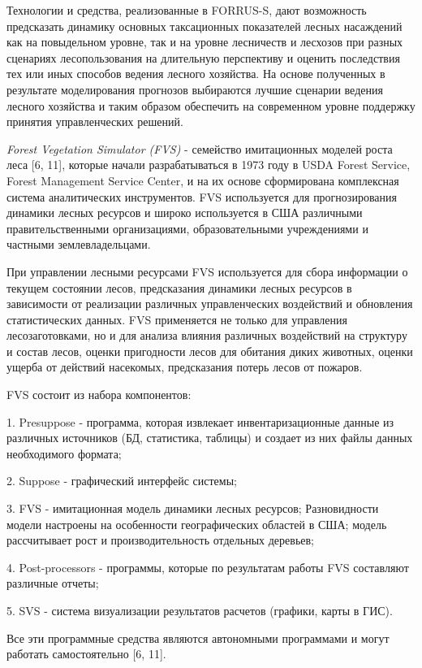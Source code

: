 \documentclass{article}
\begin{document}
Технологии и средства, реализованные в FORRUS-S, 
дают возможность предсказать динамику основных 
таксационных показателей лесных насаждений 
как на повыдельном уровне, так и на уровне лесничеств 
и лесхозов при разных сценариях лесопользования 
на длительную перспективу и оценить последствия 
тех или иных способов ведения лесного хозяйства. 
На основе полученных в результате моделирования 
прогнозов выбираются лучшие сценарии ведения 
лесного хозяйства и таким образом обеспечить 
на современном уровне поддержку принятия управленческих 
решений. 

\textit{Forest Vegetation Simulator (FVS)} - семейство имитационных 
моделей роста леса [6, 11], которые начали разрабатываться 
в 1973 году в USDA Forest Service, Forest Management Service Center, и на 
их основе сформирована комплексная система 
аналитических инструментов. FVS используется 
для прогнозирования динамики лесных ресурсов 
и широко используется в США различными правительственными 
организациями, образовательными учреждениями 
и частными землевладельцами.

При управлении лесными ресурсами FVS используется 
для сбора информации о текущем состоянии лесов, 
предсказания динамики лесных ресурсов в зависимости 
от реализации различных управленческих воздействий 
и обновления статистических данных. FVS применяется 
не только для управления лесозаготовками, но 
и для анализа влияния различных воздействий 
на структуру и состав лесов, оценки пригодности 
лесов для обитания диких животных, оценки ущерба 
от действий насекомых, предсказания потерь 
лесов от пожаров.

FVS состоит из набора компонентов:

1. Presuppose - программа, которая извлекает инвентаризационные 
данные из различных источников (БД, статистика, 
таблицы) и создает из них файлы данных необходимого 
формата;

2. Suppose - графический интерфейс системы;

3. FVS - \label{OLEHLINK20}\label{OLEHLINK21}имитационная модель 
динамики лесных ресурсов; Разновидности модели 
настроены на особенности географических областей 
в США; модель рассчитывает рост и производительность 
отдельных деревьев;

4. Post-processors - программы, которые по результатам 
работы FVS составляют различные отчеты;

5. SVS - система визуализации результатов расчетов 
(графики, карты в ГИС).

Все эти программные средства являются автономными 
программами и могут работать самостоятельно 
[6, 11]. 
\end{document}
